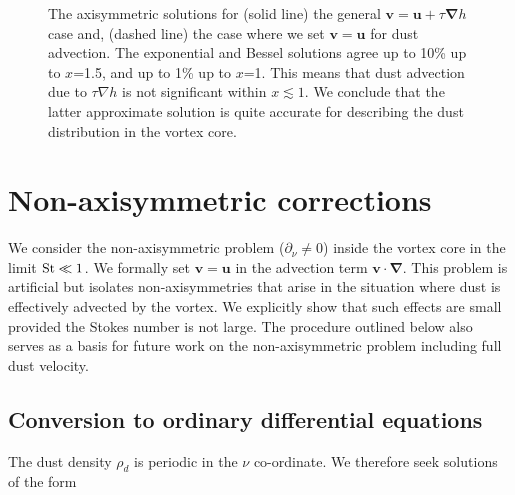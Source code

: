 \documentclass[apj]{emulateapj}
\renewcommand{\v}[1]{{\boldsymbol{#1}}} %
\newcommand{\del}{\v{\nabla}}
\newcommand{\grad}{\del}
\newcommand{\St}{{\rm St}}
\begin{document}
\begin{figure}
  \begin{center}
  \end{center}
\caption[]{The axisymmetric solutions for (solid line) the general 
$\v{v}=\v{u}+\tau\grad{h}$ case and, (dashed line) the case where
  we set $\v{v}=\v{u}$ for dust advection. 
The exponential and Bessel solutions agree up to 10\% up to $x$=1.5, and up 
to 1\% up to $x$=1. This means that dust advection due to $\tau\nabla{h}$
is not significant within $x\lesssim1$. We conclude that the latter
approximate solution is quite accurate for describing the dust
distribution in the vortex core.} 
 \label{fig:bessel-gaussian}
\end{figure}


\section{Non-axisymmetric corrections}
\label{sect:nonaxisymmetric} 

We consider the non-axisymmetric problem ($\partial_\nu\neq0$) inside
the vortex core in the limit $\St\ll 1$.  We formally set $\bm{v}=\bm{u}$ in the advection term
$\bm{v}\cdot\del$. This problem is artificial but isolates
non-axisymmetries that arise in the situation where dust is effectively 
advected by the vortex.  
We explicitly show that such
effects are small provided the Stokes number is not large. The procedure outlined below also serves as a
basis for future work on the non-axisymmetric problem including full
dust velocity.  

\subsection{Conversion to ordinary differential equations}
The dust density $\rho_d$ is periodic in the $\nu$ co-ordinate. We
therefore seek solutions of the form
\end{document}

